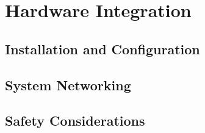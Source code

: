 \chapter{Hardware Integration}
\label{chap:integration}

\setcounter{section}{0}
\setcounter{subsection}{0}

\section{Installation and Configuration}


\section{System Networking}


\section{Safety Considerations}

